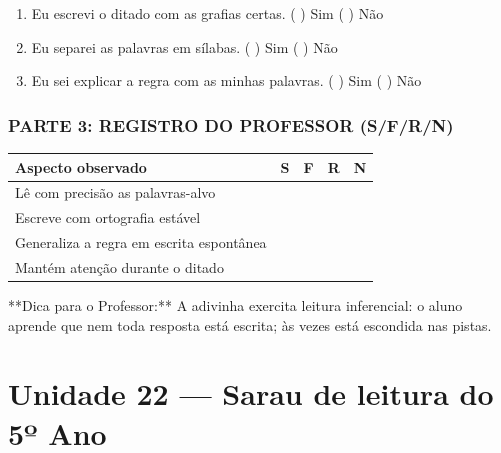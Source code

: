 \begin{exercicio}
\begin{enumerate}[label=\alph*)]
  \item Eu escrevi o ditado com as grafias certas.  \quad ( ) Sim   ( ) Não

  \item Eu separei as palavras em sílabas.  \quad ( ) Sim   ( ) Não

  \item Eu sei explicar a regra com as minhas palavras.  \quad ( ) Sim   ( ) Não

\end{enumerate}

\subsection*{PARTE 3: REGISTRO DO PROFESSOR (S/F/R/N)}

\begin{center}
\renewcommand{\arraystretch}{1.4}
\begin{tabular}{@{}p{9cm}cccc@{}}
\toprule
Aspecto observado & S & F & R & N \\
\midrule
Lê com precisão as palavras-alvo & & & & \\
Escreve com ortografia estável & & & & \\
Generaliza a regra em escrita espontânea & & & & \\
Mantém atenção durante o ditado & & & & \\
\bottomrule\end{tabular}\end{center}

\end{exercicio}

\begin{dica}
**Dica para o Professor:** A adivinha exercita leitura inferencial: o aluno aprende que nem toda resposta está escrita; às vezes está escondida nas pistas.
\end{dica}


\chapter{Unidade 22 --- Sarau de leitura do 5º Ano}


